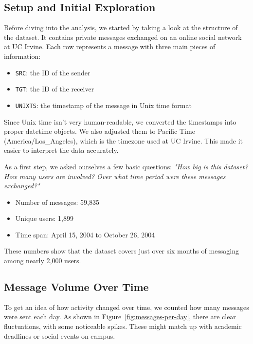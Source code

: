 \subsection{Setup and Initial Exploration}

Before diving into the analysis, we started by taking a look at the structure of the dataset. It contains private messages exchanged on an online social network at UC Irvine. Each row represents a message with three main pieces of information:

\begin{itemize}\setlength{\itemsep}{0pt}
    \item \texttt{SRC}: the ID of the sender
    \item \texttt{TGT}: the ID of the receiver
    \item \texttt{UNIXTS}: the timestamp of the message in Unix time format
\end{itemize}

Since Unix time isn't very human-readable, we converted the timestamps into proper datetime objects. We also adjusted them to Pacific Time (America/Los\_Angeles), which is the timezone used at UC Irvine. This made it easier to interpret the data accurately.

As a first step, we asked ourselves a few basic questions: \textit{"How big is this dataset? How many users are involved? Over what time period were these messages exchanged?"}

\begin{itemize}\setlength{\itemsep}{0pt}
    \item Number of messages: 59,835
    \item Unique users: 1,899
    \item Time span: April 15, 2004 to October 26, 2004
\end{itemize}

These numbers show that the dataset covers just over six months of messaging among nearly 2,000 users.

\subsection{Message Volume Over Time}

To get an idea of how activity changed over time, we counted how many messages were sent each day. As shown in Figure~\ref{fig:messages-per-day}, there are clear fluctuations, with some noticeable spikes. These might match up with academic deadlines or social events on campus.


